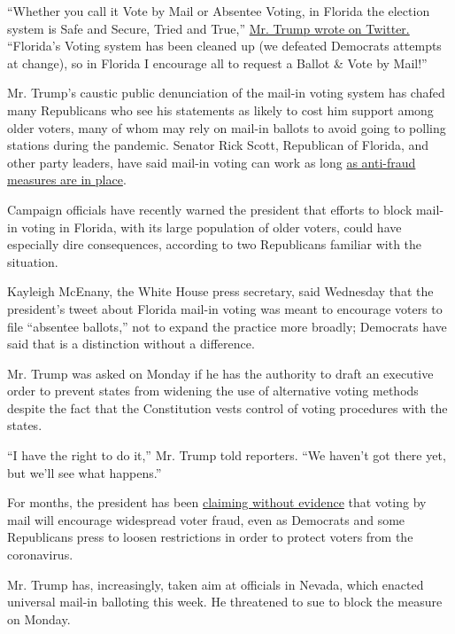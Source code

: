 ``Whether you call it Vote by Mail or Absentee Voting, in Florida the
election system is Safe and Secure, Tried and True,''
\href{https://twitter.com/realDonaldTrump/status/1290692768675901440}{Mr.
Trump wrote on Twitter.} ``Florida's Voting system has been cleaned up
(we defeated Democrats attempts at change), so in Florida I encourage
all to request a Ballot \& Vote by Mail!''

Mr. Trump's caustic public denunciation of the mail-in voting system has
chafed many Republicans who see his statements as likely to cost him
support among older voters, many of whom may rely on mail-in ballots to
avoid going to polling stations during the pandemic. Senator Rick Scott,
Republican of Florida, and other party leaders, have said mail-in voting
can work as long
\href{https://thehill.com/homenews/senate/499352-gop-senator-you-can-do-mail-in-voting-with-laws-in-place-to-limit-fraud}{as
anti-fraud measures are in place}.

Campaign officials have recently warned the president that efforts to
block mail-in voting in Florida, with its large population of older
voters, could have especially dire consequences, according to two
Republicans familiar with the situation.

Kayleigh McEnany, the White House press secretary, said Wednesday that
the president's tweet about Florida mail-in voting was meant to
encourage voters to file ``absentee ballots,'' not to expand the
practice more broadly; Democrats have said that is a distinction without
a difference.

Mr. Trump was asked on Monday if he has the authority to draft an
executive order to prevent states from widening the use of alternative
voting methods despite the fact that the Constitution vests control of
voting procedures with the states.

``I have the right to do it,'' Mr. Trump told reporters. ``We haven't
got there yet, but we'll see what happens.''

For months, the president has been
\href{https://www.nytimes.com/article/mail-in-voting-explained.html}{claiming
without evidence} that voting by mail will encourage widespread voter
fraud, even as Democrats and some Republicans press to loosen
restrictions in order to protect voters from the coronavirus.

Mr. Trump has, increasingly, taken aim at officials in Nevada, which
enacted universal mail-in balloting this week. He threatened to sue to
block the measure on Monday.

